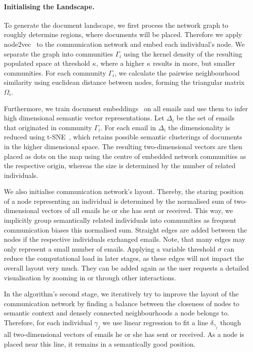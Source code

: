 \paragraph{Initialising the Landscape.}
To generate the document landscape, we first process the network graph to roughly determine regions, where documents will be placed.
Therefore we apply node2vec~\cite{grover2016node2vec} to the communication network and embed each individual's node.
We separate the graph into communities $\Gamma_i$ using the kernel density of the resulting populated space at threshold $\kappa$, where a higher $\kappa$ results in more, but smaller communities.
For each community $\Gamma_i$, we calculate the pairwise neighbourhood similarity using euclidean distance between nodes, forming the triangular matrix $\Omega_i$.

Furthermore, we train document embeddings~\cite{le2014distributed,hu2017} on all emails and use them to infer high dimensional semantic vector representations.
Let $\Delta_i$ be the set of emails that originated in community $\Gamma_i$.
For each email in $\Delta_i$ the dimensionality is reduced using t-SNE~\cite{maaten2008visualizing}, which retains possible semantic clusterings of documents in the higher dimensional space.
The resulting two-dimensional vectors are then placed as dots on the map using the centre of embedded network communities as the respective origin, whereas the size is determined by the number of related individuals.

We also initialise communication network's layout.
Thereby, the staring position of a node representing an individual is determined by the normalised sum of two-dimensional vectors of all emails he or she has sent or received.
This way, we implicitly group semantically related individuals into communities as frequent communication biases this normalised sum.
Straight edges are added between the nodes if the respective individuals exchanged emails.
Note, that many edges may only represent a small number of emails.
Applying a variable threshold $\sigma$ can reduce the computational load in later stages, as these edges will not impact the overall layout very much.
They can be added again as the user requests a detailed visualisation by zooming in or through other interactions.

In the algorithm's second stage, we iteratively try to improve the layout of the communication network by finding a balance between the closeness of nodes to semantic context and densely connected neighbourhoods a node belongs to.
Therefore, for each individual $\gamma_j$ we use linear regression to fit a line $\delta_{\gamma_j}$ though all two-dimensional vectors of emails he or she has sent or received.
As a node is placed near this line, it remains in a semantically good position.

